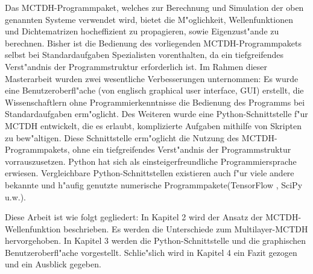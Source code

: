 Das MCTDH-Programmpaket, welches zur Berechnung und Simulation der oben ge\-nann\-ten Systeme verwendet wird, bietet die M"oglichkeit,
Wellenfunktionen und Dichte\-matrizen hocheffizient zu propagieren, sowie Eigenzust"ande zu berechnen.
Bisher ist die Bedienung des vorliegenden MCTDH-Programmpakets selbst bei Standardaufgaben Spezialisten vorenthalten, da
ein tiefgreifendes Verst"andnis der Programmstruktur erforderlich ist. 
Im Rahmen dieser Masterarbeit wurden zwei wesentliche Verbesserungen unternommen: 
Es wurde eine Benutzeroberfl"ache (von englisch graphical user interface, GUI) erstellt, die Wissenschaftlern
ohne Programmierkenntnisse die Bedienung des Programms bei Standardaufgaben erm"oglicht.
Des Weiteren wurde eine Python-Schnittstelle f"ur MCTDH entwickelt,
die es erlaubt, komplizierte Aufgaben mithilfe von Skripten zu bew"altigen.
Diese Schnittstelle erm"oglicht die Nutzung des MCTDH-Programmpakets, ohne 
ein tiefgreifendes Verst"andnis der Programmstruktur vorrauszusetzen.
Python hat sich als einsteigerfreundliche Programmiersprache erwiesen. Vergleichbare Python-Schnitt\-stellen existieren auch f"ur viele andere bekannte und h"aufig genutzte 
numerische Programmpakete(TensorFlow \cite{TensorFlow}, SciPy \cite{SciPy} u.w.).

Diese Arbeit ist wie folgt gegliedert: In Kapitel 2 wird der Ansatz der MCTDH-Wellenfunk\-tion beschrieben. 
Es werden die Unterschiede zum Multilayer-MCTDH hervorgehoben. 
In Kapitel 3 werden die Python-Schnittstelle und die graphischen Benutzeroberfl"ache vorgestellt.     
Schlie"slich wird in Kapitel 4 ein Fazit gezogen und ein Ausblick gegeben.     